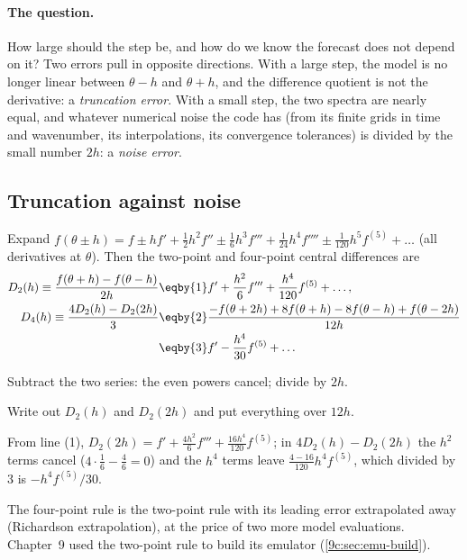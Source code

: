 \paragraph{The question.} How large should the step be, and how do we know the forecast does not depend on it?
Two errors pull in opposite directions. With a large step, the model is no longer linear between
$\theta-h$ and $\theta+h$, and the difference quotient is not the derivative: a \emph{truncation error}. With a
small step, the two spectra are nearly equal, and whatever numerical noise the code has (from its finite
grids in time and wavenumber, its interpolations, its convergence tolerances) is divided by the small number
$2h$: a \emph{noise error}.

\subsection{Truncation against noise}
\label{10a:sec:numderiv-errors}

Expand $f(\theta\pm h)=f\pm hf'+\frac12h^2f''\pm\frac16h^3f'''+\frac1{24}h^4f''''\pm\frac1{120}h^5f^{(5)}+\dots$
(all derivatives at $\theta$). Then the two-point and four-point central differences are
\begin{align}
  D_2(h)\equiv\frac{f(\theta+h)-f(\theta-h)}{2h}
  &\eqby{1}f'+\frac{h^2}6f'''+\frac{h^4}{120}f^{(5)}+\dots,
  \nonumber\\
  D_4(h)\equiv\frac{4D_2(h)-D_2(2h)}3
  &\eqby{2}\frac{-f(\theta+2h)+8f(\theta+h)-8f(\theta-h)+f(\theta-2h)}{12h}
  \nonumber\\
  &\eqby{3}f'-\frac{h^4}{30}f^{(5)}+\dots
  \label{10a:eq:stencils}
\end{align}
\begin{explain}
  \item Subtract the two series: the even powers cancel; divide by $2h$.
  \item Write out $D_2(h)$ and $D_2(2h)$ and put everything over $12h$.
  \item From line (1), $D_2(2h)=f'+\frac{4h^2}6f'''+\frac{16h^4}{120}f^{(5)}$; in $4D_2(h)-D_2(2h)$ the $h^2$ terms cancel
        ($4\cdot\frac16-\frac46=0$) and the $h^4$ terms leave $\frac{4-16}{120}h^4f^{(5)}$, which divided by $3$ is
        $-h^4f^{(5)}/30$.
\end{explain}
The four-point rule is the two-point rule with its leading error extrapolated away (Richardson
extrapolation), at the price of two more model evaluations. Chapter~9 used the two-point rule to build its
emulator (\cref{9c:sec:emu-build}).

